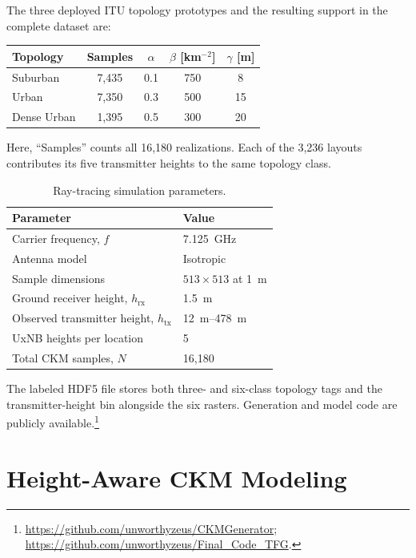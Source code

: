 \documentclass[10pt,conference,letterpaper]{IEEEtran}
\begin{document}
The three deployed ITU topology prototypes and the resulting support in the
complete dataset are:
\begin{center}
\small
\begin{tabular}{|l|c|c|c|c|}
\hline
Topology & Samples & $\alpha$ & $\beta$ [km$^{-2}$] & $\gamma$ [m] \\ \hline
Suburban & 7,435 & 0.1 & 750 & 8 \\ \hline
Urban & 7,350 & 0.3 & 500 & 15 \\ \hline
Dense Urban & 1,395 & 0.5 & 300 & 20 \\ \hline
\end{tabular}
\end{center}
Here, ``Samples'' counts all 16,180 realizations. Each of the 3,236 layouts
contributes its five transmitter heights to the same topology class.

\begin{table}[t]
\centering
\caption{Ray-tracing simulation parameters.}
\label{tab:rt_params}
\begin{tabular}{ll}
\hline
{Parameter} & {Value} \\ \hline
Carrier frequency, $f$ & \SI{7.125}{GHz} \\
Antenna model & Isotropic \\
Sample dimensions & $513\times513$ at \SI{1}{m} \\
Ground receiver height, $h_{\text{rx}}$ & \SI{1.5}{m} \\
Observed transmitter height, $h_{\text{tx}}$ & \SIrange{12}{478}{m} \\
UxNB heights per location & 5 \\
Total CKM samples, $N$ & 16,180 \\
\hline
\end{tabular}
\end{table}

The labeled HDF5 file stores both three- and six-class topology tags and the
transmitter-height bin alongside the six rasters. Generation and model code are
publicly available.\footnote{\url{https://github.com/unworthyzeus/CKMGenerator};
\url{https://github.com/unworthyzeus/Final_Code_TFG}.}

\section{Height-Aware CKM Modeling}\label{sec:ckm_model}
\end{document}
